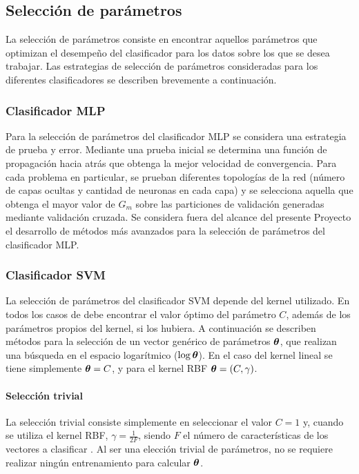 \documentclass[12pt,bibliography=oldstyle,DIV=12,parskip=half-,titlepage]{scrartcl}
\begin{document}
\subsection{Selección de parámetros}
%
%
La selección de parámetros consiste en encontrar aquellos parámetros
que optimizan el desempeño del clasificador para los datos sobre los
que se desea trabajar. Las estrategias de selección de parámetros
consideradas para los diferentes clasificadores se describen
brevemente a continuación.
%
%
\subsubsection{Clasificador MLP}
%
Para la selección de parámetros del clasificador MLP se considera una
estrategia de prueba y error. Mediante una prueba inicial se determina
una función de propagación hacia atrás que obtenga la mejor velocidad
de convergencia. Para cada problema en particular, se prueban
diferentes topologías de la red (número de capas ocultas y cantidad de
neuronas en cada capa) y se selecciona aquella que obtenga el mayor
valor de $G_m$ sobre las particiones de validación generadas mediante
validación cruzada.  Se considera fuera del alcance del presente Proyecto
el desarrollo de métodos más avanzados para la selección de
parámetros del clasificador MLP.
%
%
\subsubsection{Clasificador SVM}
%
La selección de parámetros del clasificador SVM depende del kernel
utilizado. En todos los casos de debe encontrar el valor óptimo del
parámetro $C$, además de los parámetros propios del kernel, si los
hubiera. A continuación se describen métodos para la selección de un
vector genérico de parámetros $\boldsymbol{\theta}$, que realizan una búsqueda
en el espacio logarítmico ($\log\boldsymbol{\theta}$). En el caso del kernel
lineal se tiene simplemente $\boldsymbol{\theta}=C$, y para el kernel RBF
$\boldsymbol{\theta}=(C,\gamma)$.
%
%
\paragraph{Selección trivial}
La selección trivial consiste simplemente en seleccionar el valor
$C=1$ y, cuando se utiliza el kernel RBF, $\gamma=\frac{1}{2F}$,
siendo $F$ el número de características de los vectores a clasificar
\cite{glasmachersigel}. Al ser una elección trivial de parámetros, no
se requiere realizar ningún entrenamiento para calcular $\boldsymbol{\theta}$.
%
%
\end{document}
